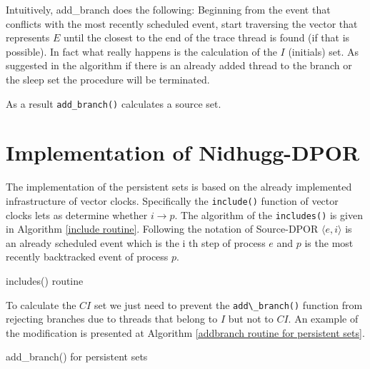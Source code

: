 Intuitively, add\_branch does the following: Beginning from the event that conflicts with the most recently scheduled
event, start traversing the vector that represents $E$ until the closest to the end of the trace thread is found (if
that is possible). In fact what really happens is the calculation of the $I$ (initials) set. As suggested in the
algorithm if there is an already added thread to the branch or the sleep set the procedure will be terminated.

As a result \verb|add_branch()| calculates a source set.

\section{Implementation of Nidhugg-DPOR}

The implementation of the persistent sets is based on the already implemented infrastructure of vector clocks.
Specifically the \verb|include()| function of vector clocks lets as determine whether $i \rightarrow p$. The algorithm
of the \verb|includes()| is given in Algorithm \ref{include routine}. Following the notation of Source-DPOR $\langle e,
i \rangle$ is an already scheduled event which is the i th step of process $e$  and $p$ is the most recently backtracked
event of process $p$. 

\begin{algorithm}
    \caption{includes() routine}
    \label{include routine}
\end{algorithm}

To calculate the $CI$ set we just need to prevent the \verb|add\_branch()| function from rejecting branches due to
threads that belong to $I$ but not to $CI$. An example of the modification is presented at Algorithm \ref{addbranch
routine for persistent sets}.

\begin{algorithm}
    \caption{add\_branch() for persistent sets}
    \label{addbranch routine for persistent sets}
\end{algorithm}

